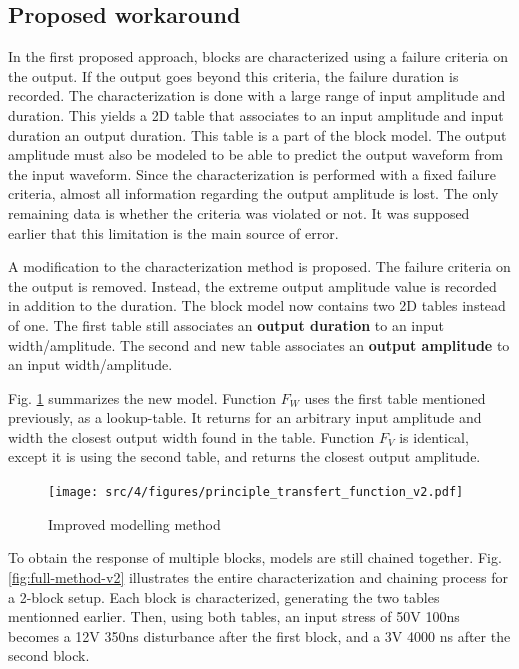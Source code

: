 \subsection{Proposed workaround}

%
In the first proposed approach, blocks are characterized using a failure criteria on the output.
If the output goes beyond this criteria, the failure duration is recorded.
The characterization is done with a large range of input amplitude and duration.
This yields a 2D table that associates to an input amplitude and input duration an output duration.
This table is a part of the block model.
The output amplitude must also be modeled to be able to predict the output waveform from the input waveform.
Since the characterization is performed with a fixed failure criteria, almost all information regarding the output amplitude is lost.
The only remaining data is whether the criteria was violated or not.
It was supposed earlier that this limitation is the main source of error.

A modification to the characterization method is proposed.
The failure criteria on the output is removed.
Instead, the extreme output amplitude value is recorded in addition to the duration.
The block model now contains two 2D tables instead of one.
The first table still associates an \textbf{output duration} to an input width/amplitude.
The second and new table associates an \textbf{output amplitude} to an input width/amplitude.

Fig. \ref{fig:principle-transfert-func-v2} summarizes the new model.
Function $F_{W}$ uses the first table mentioned previously, as a \gls{lookup-table}.
It returns for an arbitrary input amplitude and width the closest output width found in the table.
Function $F_{V}$ is identical, except it is using the second table, and returns the closest output amplitude.

\begin{figure}[!h]
  \centering
  \texttt{[image: src/4/figures/principle\_transfert\_function\_v2.pdf]}
  \caption{Improved modelling method}
  \label{fig:principle-transfert-func-v2}
\end{figure}

To obtain the response of multiple blocks, models are still chained together.
Fig. \ref{fig:full-method-v2} illustrates the entire characterization and chaining process for a 2-block setup.
Each block is characterized, generating the two tables mentionned earlier.
Then, using both tables, an input stress of 50V 100ns becomes a 12V 350ns disturbance after the first block, and a 3V 4000 ns after the second block.

